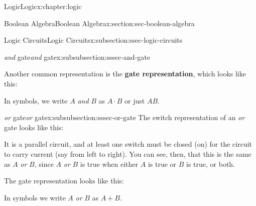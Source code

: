 \documentclass[twoside,10pt,]{book}
\newcommand{\terminology}[1]{\textbf{#1}}
\numberwithin{equation}{section}
\begin{document}
\begin{chapterptx}{Logic}{}{Logic}{}{}{x:chapter:logic}
\begin{sectionptx}{Boolean Algebra}{}{Boolean Algebra}{}{}{x:section:sec-boolean-algebra}
\begin{subsectionptx}{Logic Circuits}{}{Logic Circuits}{}{}{x:subsection:ssec-logic-circuits}
\begin{subsubsectionptx}{\emph{and} gate}{}{\emph{and} gate}{}{}{x:subsubsection:sssec-and-gate}
\par
Another common representation is the \terminology{gate representation}, which looks like this:  \begin{image}{0.35}{0.3}{0.35}%
%
\end{image}%
 In symbols, we write \(A\) \emph{and} \(B\) as \(A\cdot B\) or just \(AB\).%
\end{subsubsectionptx}
%
%
\typeout{************************************************}
\typeout{************************************************}
%
\begin{subsubsectionptx}{\emph{or} gate}{}{\emph{or} gate}{}{}{x:subsubsection:sssec-or-gate}
The switch representation of an \emph{or} gate looks like this:  \begin{image}{0.35}{0.3}{0.35}%
%
\end{image}%
 It is a parallel circuit, and at least one switch must be closed (on) for the circuit to carry current (say from left to right).  You can see, then, that this is the same as \(A\) \emph{or} \(B\), since \(A\) \emph{or} \(B\) is true when either \(A\) is true or \(B\) is true, or both.%
\par
The gate representation looks like this:  \begin{image}{0.35}{0.3}{0.35}%
%
\end{image}%
 In symbols we write \(A\) \emph{or} \(B\) as \(A+B\).%
\end{subsubsectionptx}
%
%
\typeout{************************************************}

\end{subsectionptx}
\end{sectionptx}
\end{chapterptx}
\end{document}

